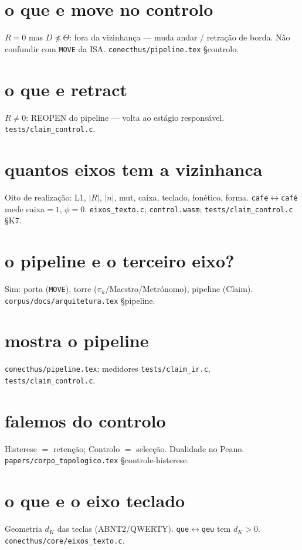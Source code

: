 \documentclass[11pt,a4paper]{article}
\newcommand{\code}[1]{\texttt{\small #1}}
\begin{document}
\section{o que e move no controlo}
$R=0$ mas $D\npreceq\Theta$: fora da vizinhança --- muda andar / retração de
borda. Não confundir com \code{MOVE} da ISA.
\code{conecthus/pipeline.tex} \S controlo.

\section{o que e retract}
$R\neq0$: REOPEN do pipeline --- volta ao estágio responsável.
\code{tests/claim\_control.c}.

\section{quantos eixos tem a vizinhanca}
Oito de realização: L1, $|R|$, $|n|$, mut, caixa, teclado, fonético, forma.
\texttt{cafe}$\leftrightarrow$\texttt{café} mede caixa$=1$, $\phi=0$.
\code{eixos\_texto.c}; \code{control.wasm}; \code{tests/claim\_control.c} \S K7.

\section{o pipeline e o terceiro eixo?}
Sim: porta (\code{MOVE}), torre ($\pi_k$/Maestro/Metrónomo), pipeline (Claim).
\code{corpus/docs/arquitetura.tex} \S pipeline.

\section{mostra o pipeline}
\code{conecthus/pipeline.tex}; medidores \code{tests/claim\_ir.c},
\code{tests/claim\_control.c}.

\section{falemos do controlo}
Histerese $=$ retenção; Controlo $=$ selecção. Dualidade no Peano.
\code{papers/corpo\_topologico.tex} \S controle-histerese.

\section{o que e o eixo teclado}
Geometria $d_K$ das teclas (ABNT2/QWERTY). \texttt{que}$\leftrightarrow$\texttt{qeu}
tem $d_K>0$. \code{conecthus/core/eixos\_texto.c}.
\end{document}
